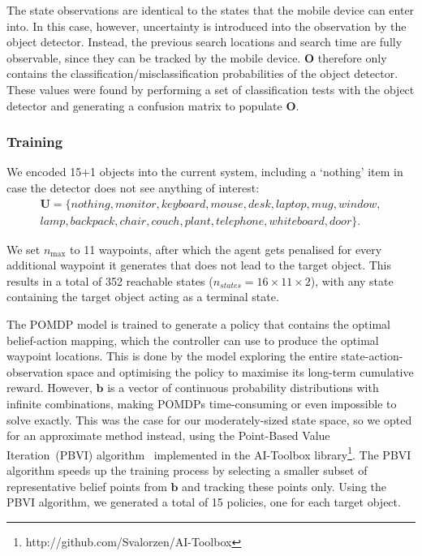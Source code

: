 \documentclass[runningheads]{llncs}
\begin{document}
The state observations are identical to the states that the mobile device can enter into. 
In this case, however, uncertainty is introduced into the observation by the object detector.
Instead, the previous search locations and search time are fully observable, since they can be tracked by the mobile device.
$\mathbf{O}$ therefore only contains the classification/misclassification probabilities of the object detector.
These values were found by performing a set of classification tests with the object detector and generating a confusion matrix to populate $\mathbf{O}$.

\subsubsection{Training}

We encoded 15+1 objects into the current system, including a `nothing' item in case the detector does not see anything of interest:
\begin{equation*}
  \begin{split}
    \mathbf{U} = \{ nothing, monitor, keyboard, mouse, desk, laptop, mug, window,\\ 
      lamp, backpack, chair, couch, plant, telephone, whiteboard, door \}.
  \end{split}
\end{equation*}

\noindent We set $n_{\max}$ to 11 waypoints, after which the agent gets penalised for every additional waypoint it generates that does not lead to the target object. 
This results in a total of 352 reachable states ($n_{states} = 16\times11\times2$), with any state containing the target object acting as a terminal state.

The POMDP model is trained to generate a policy that contains the optimal belief-action mapping, which the controller can use to produce the optimal waypoint locations.
This is done by the model exploring the entire state-action-observation space and optimising the policy to maximise its long-term cumulative reward.
However, $\mathbf{b}$ is a vector of continuous probability distributions with infinite combinations, making POMDPs time-consuming or even impossible to solve exactly.
This was the case for our moderately-sized state space, so we opted for an approximate method instead, using the Point-Based Value Iteration~(PBVI) algorithm~\cite{pineau2003point} implemented in the AI-Toolbox library\footnote{http://github.com/Svalorzen/AI-Toolbox}.
The PBVI algorithm speeds up the training process by selecting a smaller subset of representative belief points from $\mathbf{b}$ and tracking these points only. 
Using the PBVI algorithm, we generated a total of 15 policies, one for each target object. 
\end{document}
